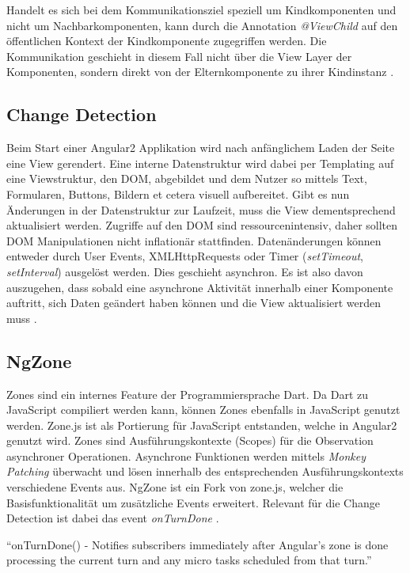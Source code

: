 Handelt es sich bei dem Kommunikationsziel speziell um Kindkomponenten und nicht um Nachbarkomponenten,
kann durch die Annotation \emph{@ViewChild} auf den öffentlichen Kontext der Kindkomponente zugegriffen werden.
Die Kommunikation geschieht in diesem Fall nicht über die View Layer der Komponenten,
sondern direkt von der Elternkomponente zu ihrer Kindinstanz \cite{ViewC61:online}.


\subsection{Change Detection}
\label{sec:change-detection}

Beim Start einer Angular2 Applikation wird nach anfänglichem Laden der Seite eine View gerendert.
Eine interne Datenstruktur wird dabei per Templating auf eine Viewstruktur, den DOM, abgebildet und dem Nutzer so mittels Text,
Formularen, Buttons, Bildern et cetera visuell aufbereitet.
Gibt es nun Änderungen in der Datenstruktur zur Laufzeit, muss die View dementsprechend aktualisiert werden.
Zugriffe auf den DOM sind ressourcenintensiv, daher sollten DOM Manipulationen nicht inflationär stattfinden.
Datenänderungen können entweder durch User Events, XMLHttpRequests oder Timer (\emph{setTimeout}, \emph{setInterval}) ausgelöst werden.
Dies geschieht asynchron. Es ist also davon auszugehen, dass sobald eine asynchrone Aktivität innerhalb einer Komponente auftritt,
sich Daten geändert haben können und die View aktualisiert werden muss \cite{changedetection-explained}.

\subsection{NgZone}

Zones sind ein internes Feature der Programmiersprache Dart. Da Dart zu JavaScript compiliert werden kann,
können Zones ebenfalls in JavaScript genutzt werden. Zone.js ist als Portierung für JavaScript entstanden, welche in Angular2 genutzt wird.
Zones sind Ausführungskontexte (Scopes) für die Observation asynchroner Operationen.
Asynchrone Funktionen werden mittels \emph{Monkey Patching} überwacht und lösen innerhalb des entsprechenden Ausführungskontexts verschiedene Events aus.
NgZone ist ein Fork von zone.js, welcher die Basisfunktionalität um zusätzliche Events erweitert.
Relevant für die Change Detection ist dabei das event \emph{onTurnDone} \cite{changedetection-explained}.

\vspace{0.3cm}
``onTurnDone() - Notifies subscribers immediately after Angular’s zone is done processing the current turn and any micro tasks scheduled from that turn.''
\cite{ZONESINANGULAR2}
\vspace{0.3cm}

